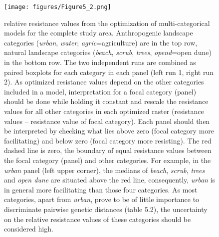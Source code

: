 \documentclass[10pt, twoside]{book} %
\begin{document}
		\begin{figure}[h!]
			\begin{center}
				\texttt{[image: figures/Figure5\_2.png]}
			\end{center}
			\begin{footnotesize}
				\caption{relative resistance values from the optimization of multi-categorical models for the complete study area. Anthropogenic landscape categories (\textit{urban}, \textit{water}, \textit{agric}=agriculture) are in the top row, natural landscape categories (\textit{beach}, \textit{scrub}, \textit{trees}, \textit{opend}=open dune) in the bottom row. The two independent runs are combined as paired boxplots for each category in each panel (left run 1, right run 2). As optimized resistance values depend on the other categories included in a model, interpretation for a focal category (panel) should be done while holding it constant and rescale the resistance values for all other categories in each optimized raster (resistance values -- resistance value of focal category). Each panel should then be interpreted by checking what lies above zero (focal category more facilitating) and below zero (focal category more resisting). The red dashed line is zero, the boundary of equal resistance values between the focal category (panel) and other categories. For example, in the \textit{urban} panel (left upper corner), the medians of \textit{beach}, \textit{scrub}, \textit{trees} and \textit{open dune} are situated above the red line, consequently, \textit{urban} is in general more facilitating than those four categories. As most categories, apart from \textit{urban}, prove to be of little importance to discriminate pairwise genetic distances (table 5.2), the uncertainty on the relative resistance values of these categories should be considered high.  \label{fig5.2}}
			\end{footnotesize}
		\end{figure}
	\vspace*{\fill}\clearpage
	
\end{document}
